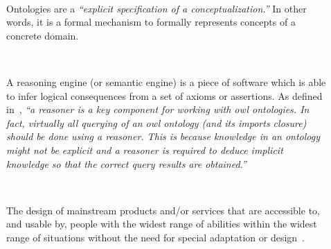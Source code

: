 \begin{description} 
  \item[] \hfill \\
  \begin{mdframed}[hidealllines=true,backgroundcolor=gray!20]
  Ontologies are a \textit{``explicit specification of a conceptualization.''} 
  In other words, it is a formal mechanism to formally represents concepts of a 
  concrete domain.
  \end{mdframed}
  
  \item[] \hfill \\
  \begin{mdframed}[hidealllines=true,backgroundcolor=gray!20]
  A reasoning engine (or semantic engine) is a piece of software which is able 
  to infer logical consequences from a set of axioms or assertions. As defined
  in~\citep{owlapi_reasoners}, \textit{``a reasoner is a key component for working 
  with \ac{owl} ontologies. In fact, virtually all querying of an \ac{owl} ontology 
  (and its imports closure) should be done using a reasoner. This is because 
  knowledge in an ontology might not be explicit and a reasoner is required to 
  deduce implicit knowledge so that the correct query results are obtained.''}
  \end{mdframed}

  \item[] \hfill \\
  \begin{mdframed}[hidealllines=true,backgroundcolor=gray!20]
  The design of mainstream products and/or services that are accessible to, and
  usable by, people with the widest range of abilities within the widest range
  of situations without the need for special adaptation or design~\citep{design_2005}.
  \end{mdframed}
\end{description}